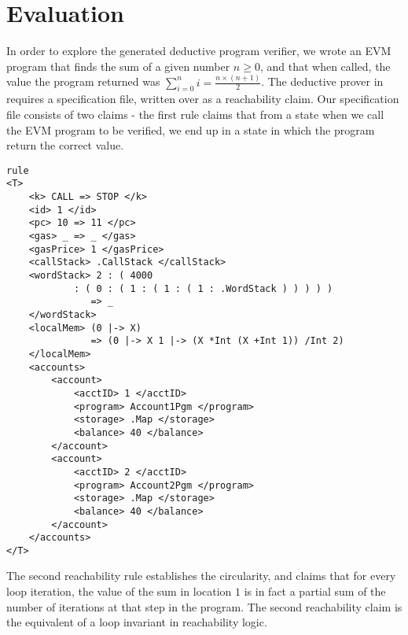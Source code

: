 \section{Evaluation}
In order to explore the generated deductive program verifier, we wrote an EVM
program that finds the sum of a given number $n \geq 0 $, and that when called, the
value the program returned was $ \sum_{i = 0}^{n} i =  \frac{n \times  (n + 1 )}{2}$. The deductive
prover in \K{} requires a specification file, written over as a reachability
claim. Our specification file consists of two claims - the first rule claims
that from a state when we call the EVM program to be verified, we end up in a state in which the program return the correct value.  

\begin{verbatim}
rule
<T> 
    <k> CALL => STOP </k> 
    <id> 1 </id> 
    <pc> 10 => 11 </pc> 
    <gas> _ => _ </gas>
    <gasPrice> 1 </gasPrice> 
    <callStack> .CallStack </callStack> 
    <wordStack> 2 : ( 4000 
            : ( 0 : ( 1 : ( 1 : ( 1 : .WordStack ) ) ) ) ) 
               => _ 
    </wordStack> 
    <localMem> (0 |-> X) 
               => (0 |-> X 1 |-> (X *Int (X +Int 1)) /Int 2) 
    </localMem>
    <accounts>
        <account>     
            <acctID> 1 </acctID> 
            <program> Account1Pgm </program>
            <storage> .Map </storage>
            <balance> 40 </balance> 
        </account>
        <account>
            <acctID> 2 </acctID> 
            <program> Account2Pgm </program>
            <storage> .Map </storage>
            <balance> 40 </balance> 
        </account>
    </accounts>
</T>
\end{verbatim}

The second reachability rule establishes the circularity, and claims that for
every loop iteration, the value of the sum in location $1$ is in fact a partial
sum of the number of iterations at that step in the program. The second
reachability claim is the equivalent of a loop invariant in reachability logic.

